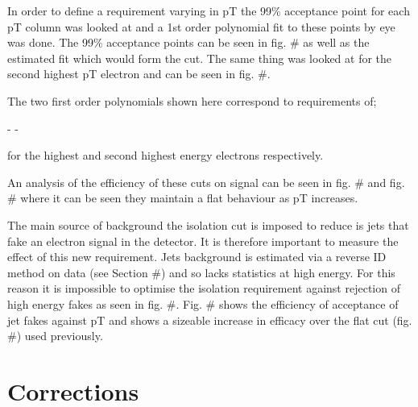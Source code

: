 In order to define a requirement varying in pT the 99\% acceptance point for each pT column was looked at and a 1st order polynomial fit to these points by eye was done. The 99\% acceptance points can be seen in fig. \# as well as the estimated fit which would form the cut. The same thing was looked at for the second highest pT electron and can be seen in fig. \#.

The two first order polynomials shown here correspond to requirements of;

-
-

for the highest and second highest energy electrons respectively. 

An analysis of the efficiency of these cuts on signal can be seen in fig. \# and fig. \# where it can be seen they maintain a flat behaviour as pT increases.

The main source of background the isolation cut is imposed to reduce is jets that fake an electron signal in the detector. It is therefore important to measure the effect of this new requirement. Jets background is estimated via a reverse ID method on data (see Section \#) and so lacks statistics at high energy. For this reason it is impossible to optimise the isolation requirement against rejection of high energy fakes as seen in fig. \#. Fig. \# shows the efficiency of acceptance of jet fakes against pT and shows a sizeable increase in efficacy over the flat cut (fig. \#) used previously. 



\section{Corrections}
